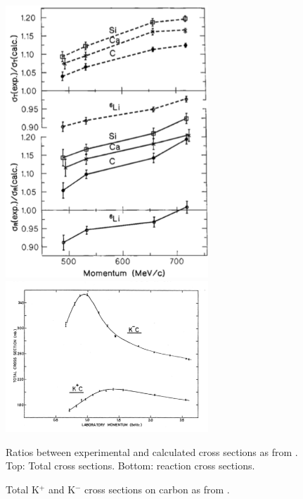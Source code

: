 \begin{figure}
\captionsetup{justification=raggedright}  
\begin{minipage}[b]{.5\textwidth}  
  \centering  
\includegraphics[width=3in]{images/Lariat/Friedmann.png}
\end{minipage}%
\begin{minipage}[b]{0.5\textwidth}  
  \centering  
\includegraphics[width=3in]{images/Lariat/Bugg.png}
\end{minipage}
\par
\begin{minipage}[t]{.53\textwidth}
\caption{Ratios between experimental and calculated cross sections as from \cite{Friedman:1997eq}. Top: Total cross sections. Bottom: reaction cross sections.}
\label{fig:Friedmann}
\end{minipage}%
\begin{minipage}[t]{.5\textwidth}  
\caption{Total K$^+$  and K$^-$ cross sections on carbon as from \cite{PhysRev.168.1466}.}
\label{fig:Bugg}
\end{minipage}  
\end{figure}



